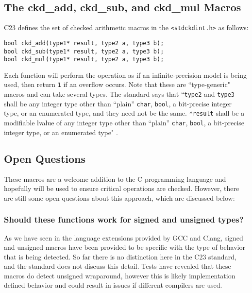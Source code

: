 \subsection{The ckd\_add, ckd\_sub, and ckd\_mul Macros}

C23 defines the set of checked arithmetic macros in the \texttt{<stdckdint.h>} as follows:

\begin{flushleft}
\texttt{bool ckd\_add(type1* result, type2 a, type3 b);}\\
\texttt{bool ckd\_sub(type1* result, type2 a, type3 b);}\\
\texttt{bool ckd\_mul(type1* result, type2 a, type3 b);}
\end{flushleft}

Each function will perform the operation as if an infinite-precision model is being used, then return \texttt{1} if an overflow occurs. Note that these are ``type-generic" macros and can take several types. The standard says that ``\texttt{type2} and \texttt{type3} shall be any integer type other than ``plain” \texttt{char}, \texttt{bool}, a bit-precise integer type, or an enumerated type, and they need not be the same. \texttt{*result} shall be a modifiable lvalue of any integer type other than ``plain” \texttt{char}, \texttt{bool}, a bit-precise integer type, or an enumerated type" \cite{ckd_arith}.

\subsection{Open Questions}

These macros are a welcome addition to the C programming language and hopefully will be used to ensure critical operations are checked. However, there are still some open questions about this approach, which are discussed below:

\subsubsection{Should these functions work for signed and unsigned types?}
As we have seen in the language extensions provided by GCC and Clang, signed and unsigned macros have been provided to be specific with the type of behavior that is being detected. So far there is no distinction here in the C23 standard, and the standard does not discuss this detail. Tests have revealed that these macros do detect unsigned wraparound, however this is likely implementation defined behavior and could result in issues if different compilers are used.

